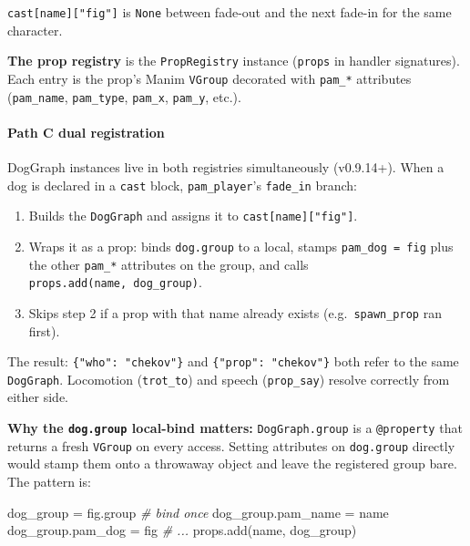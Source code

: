 \documentclass[
  12pt,
  letterpaper,
]{book}
\newenvironment{Shaded}{}{}
\newcommand{\CommentTok}[1]{\textcolor[rgb]{0.38,0.63,0.69}{\textit{#1}}}
\newcommand{\NormalTok}[1]{#1}
\newcommand{\OperatorTok}[1]{\textcolor[rgb]{0.40,0.40,0.40}{#1}}
\providecommand{\tightlist}{%
  \setlength{\itemsep}{0pt}\setlength{\parskip}{0pt}}
\begin{document}
\texttt{cast{[}name{]}{[}"fig"{]}} is \texttt{None} between fade-out and
the next fade-in for the same character.

\textbf{The prop registry} is the \texttt{PropRegistry} instance
(\texttt{props} in handler signatures). Each entry is the prop's Manim
\texttt{VGroup} decorated with \texttt{pam\_*} attributes
(\texttt{pam\_name}, \texttt{pam\_type}, \texttt{pam\_x},
\texttt{pam\_y}, etc.).

\paragraph{Path C dual registration}\label{path-c-dual-registration}

DogGraph instances live in both registries simultaneously (v0.9.14+).
When a dog is declared in a \texttt{cast} block, \texttt{pam\_player}'s
\texttt{fade\_in} branch:

\begin{enumerate}
\def\labelenumi{\arabic{enumi}.}
\tightlist
\item
  Builds the \texttt{DogGraph} and assigns it to
  \texttt{cast{[}name{]}{[}"fig"{]}}.
\item
  Wraps it as a prop: binds \texttt{dog.group} to a local, stamps
  \texttt{pam\_dog\ =\ fig} plus the other \texttt{pam\_*} attributes on
  the group, and calls \texttt{props.add(name,\ dog\_group)}.
\item
  Skips step 2 if a prop with that name already exists
  (e.g.~\texttt{spawn\_prop} ran first).
\end{enumerate}

The result: \texttt{\{"who":\ "chekov"\}} and
\texttt{\{"prop":\ "chekov"\}} both refer to the same \texttt{DogGraph}.
Locomotion (\texttt{trot\_to}) and speech (\texttt{prop\_say}) resolve
correctly from either side.

\textbf{Why the \texttt{dog.group} local-bind matters:}
\texttt{DogGraph.group} is a \texttt{@property} that returns a fresh
\texttt{VGroup} on every access. Setting attributes on
\texttt{dog.group} directly would stamp them onto a throwaway object and
leave the registered group bare. The pattern is:

\begin{Shaded}
\begin{Highlighting}[]
\NormalTok{dog\_group }\OperatorTok{=}\NormalTok{ fig.group     }\CommentTok{\# bind once}
\NormalTok{dog\_group.pam\_name }\OperatorTok{=}\NormalTok{ name}
\NormalTok{dog\_group.pam\_dog  }\OperatorTok{=}\NormalTok{ fig}
\CommentTok{\# ...}
\NormalTok{props.add(name, dog\_group)}
\end{Highlighting}
\end{Shaded}
\end{document}
